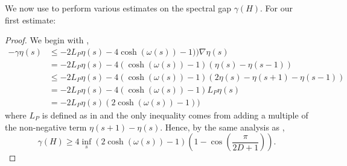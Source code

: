 We now use  to perform various estimates on the spectral gap $\gamma(H)$. For our first estimate:
\LC*
\begin{proof}
	We begin with ,
	\begin{align*}
	 	-\gamma \eta(s) &\leq -2L_P\eta(s) - 4 \cosh(\omega(s))-1))\nabla\eta(s)	\\
	 	&= -2L_P\eta(s) - 4 (\cosh(\omega(s))-1)\left(\eta(s)-\eta(s-1)\right) \\
	 	{} &\leq -2L_P\eta(s) - 4 (\cosh(\omega(s))-1)\left(2\eta(s)-\eta(s+1)-\eta(s-1)\right)\\
	 	{} &= -2L_P\eta(s) - 4 (\cosh(\omega(s))-1)L_P \eta(s)\\
	 	{} &= -2L_P\eta(s)(2\cosh(\omega(s))-1))
	 \end{align*}
	 where $L_P$ is defined as in  and the only inequality comes from adding a multiple of the non-negative term $\eta(s+1)-\eta(s)$. Hence, by the same analysis as ,
	 \begin{equation*}
		 \gamma(H) \geq 4 \inf_s \left(2\cosh(\omega(s))-1\right)\left(1-\cos\left(\frac{\pi}{2D+1}\right)\right).
	\end{equation*}
\end{proof}

